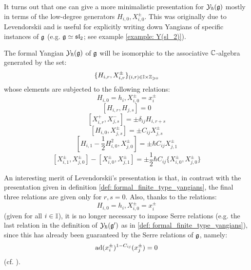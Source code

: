         It turns out that one can give a more minimalistic presentation for $\mathcal{Y}_{\hbar}(\mathfrak{g})$ mostly in terms of the low-degree generators $H_{i, 0}, X_{i, 0}^{\pm}$. This was originally due to Levendorskii and is useful for explicitly writing down Yangians of specific instances of $\mathfrak{g}$ (e.g. $\mathfrak{g} \simeq \mathfrak{sl}_2$; see example \ref{example: Y(sl_2)}).
        \begin{theorem} \label{theorem: levendorskii_presentation}
            \cite[Theorem 1.2]{levendorskii_finite_type_yangians_presentation} The formal Yangian $\mathcal{Y}_{\hbar}(\mathfrak{g})$ of $\mathfrak{g}$ will be isomorphic to the associative $\mathbb{C}$-algebra generated by the set:
                $$\{ H_{i, r}, X_{i, r}^{\pm} \}_{(i, r) \in \simpleroots \x \Z_{\geq 0}}$$
            whose elements are subjected to the following relations:
                $$H_{i, 0} = h_i, X_{i, 0}^{\pm} = x_i^{\pm}$$
                $$[ H_{i, r}, H_{j, s} ] = 0$$
                $$[ X_{i, r}^+, X_{j, s}^- ] = \pm \delta_{ij} H_{i, r + s}$$
                $$[ H_{i, 0}, X_{j, s}^{\pm} ] = \pm C_{ij} X_{j, s}^{\pm}$$
                $$\left[ H_{i, 1} - \frac12 H_{i, 0}^2, X_{j, 0}^{\pm} \right] = \pm \hbar C_{ij} X_{j, 1}^{\pm}$$
                $$[ X_{i, 1}^{\pm}, X_{j, 0}^{\pm} ] - [ X_{i, 0}^{\pm}, X_{j, 1}^{\pm} ] = \pm \frac12 \hbar C_{ij} \{X_{i, 0}^{\pm}, X_{j, 0}^{\pm}\}$$
        \end{theorem}
        \begin{remark}
            An interesting merit of Levendorskii's presentation is that, in contrast with the presentation given in definition \ref{def: formal_finite_type_yangians}, the final three relations are given only for $r, s = 0$. Also, thanks to the relations:
                $$H_{i, 0} = h_i, X_{i, 0}^{\pm} = x_i^{\pm}$$
            (given for all $i \in \mathbb{I}$), it is no longer necessary to impose Serre relations (e.g. the last relation in the definition of $\mathcal{Y}_{\hbar}(\mathfrak{g}')$ as in \ref{def: formal_finite_type_yangians}), since this has already been guaranteed by the Serre relations of $\mathfrak{g}$, namely:
                $$\mathrm{ad}(x_i^{\pm})^{1 - C_{ij}}( x_j^{\pm} ) = 0$$
            (cf. \cite{humphreys_lie_algebras}).
        \end{remark}
